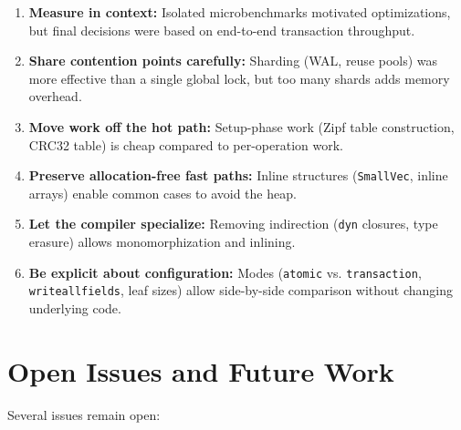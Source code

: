 \documentclass[11pt]{article}
\newcommand{\code}[1]{\texttt{#1}}
\begin{document}
\begin{enumerate}
  \item \textbf{Measure in context:} Isolated microbenchmarks motivated optimizations,
        but final decisions were based on end-to-end transaction throughput.

  \item \textbf{Share contention points carefully:} Sharding (WAL, reuse pools) was
        more effective than a single global lock, but too many shards adds memory overhead.

  \item \textbf{Move work off the hot path:} Setup-phase work (Zipf table construction,
        CRC32 table) is cheap compared to per-operation work.

  \item \textbf{Preserve allocation-free fast paths:} Inline structures (\code{SmallVec},
        inline arrays) enable common cases to avoid the heap.

  \item \textbf{Let the compiler specialize:} Removing indirection (\code{dyn} closures,
        type erasure) allows monomorphization and inlining.

  \item \textbf{Be explicit about configuration:} Modes (\code{atomic} vs. \code{transaction},
        \code{writeallfields}, leaf sizes) allow side-by-side comparison without changing
        underlying code.
\end{enumerate}

\newpage

\section{Open Issues and Future Work}
\label{sec:open}

Several issues remain open:
\end{document}
